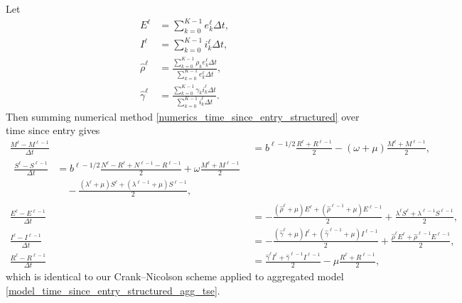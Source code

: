 \documentclass[USenglish]{article}
\begin{document}
Let
\begin{subequations}
  \begin{align}
    E^{\ell}
    &= \sum_{k = 0}^{K - 1} e_k^{\ell} \Delta t,
    \\
    I^{\ell}
    &= \sum_{k = 0}^{K - 1} i_k^{\ell} \Delta t,
    \\
    \hat{\rho}^{\ell}
    &= \frac{\sum_{k = 0}^{K - 1} \rho_k e_k^{\ell} \Delta t}
      {\sum_{k = 0}^{K - 1} e_k^{\ell} \Delta t},
    \\
    \hat{\gamma}^{\ell}
    &= \frac{\sum_{k = 0}^{K - 1} \gamma_k i_k^{\ell} \Delta t}
      {\sum_{k = 0}^{K - 1} i_k^{\ell} \Delta t}.
  \end{align}
\end{subequations}
Then summing numerical method
\eqref{numerics_time_since_entry_structured} over time since entry
gives
\begin{subequations}
  \label{numerics_time_since_entry_structured_agg_tse}
  \begin{align}
    \frac{M^{\ell}  - M^{\ell - 1}}{\Delta t}
    &= b^{\ell - 1 / 2} \frac{R^{\ell} + R^{\ell - 1}}{2}
    - (\omega + \mu) \frac{M^{\ell} + M^{\ell - 1}}{2},
    \\
    \begin{split}
      \frac{S^{\ell} - S^{\ell - 1}}{\Delta t}
      &= b^{\ell - 1 / 2}
      \frac{N^{\ell} - R^{\ell} + N^{\ell - 1} - R^{\ell - 1}}{2}
      + \omega \frac{M^{\ell} + M^{\ell - 1}}{2}
      \\ & \quad {}
      - \frac{(\lambda^{\ell} + \mu) S^{\ell}
        + (\lambda^{\ell - 1} + \mu) S^{\ell - 1}}{2},
    \end{split}
    \\
    \frac{E^{\ell}  - E^{\ell - 1}}{\Delta t}
    &= - \frac{(\hat{\rho}^{\ell} + \mu) E^{\ell}
      + (\hat{\rho}^{\ell - 1} + \mu) E^{\ell - 1}}{2}
      + \frac{\lambda^{\ell} S^{\ell}
      + \lambda^{\ell - 1} S^{\ell - 1}}{2},
    \\
    \frac{I^{\ell}  - I^{\ell - 1}}{\Delta t}
    &= - \frac{(\hat{\gamma}^{\ell} + \mu) I^{\ell}
      + (\hat{\gamma}^{\ell - 1} + \mu) I^{\ell - 1}}{2}
      + \frac{\hat{\rho}^{\ell} E^{\ell}
      + \hat{\rho}^{\ell - 1} E^{\ell - 1}}{2},
    \\
    \frac{R^{\ell} - R^{\ell - 1}}{\Delta t}
    &= \frac{\hat{\gamma}^{\ell} I^{\ell}
      + \hat{\gamma}^{\ell - 1} I^{\ell - 1}}{2}
      - \mu \frac{R^{\ell} + R^{\ell - 1}}{2},
  \end{align}
\end{subequations}
which is identical to our Crank--Nicolson scheme applied to aggregated
model \eqref{model_time_since_entry_structured_agg_tse}.
\end{document}
